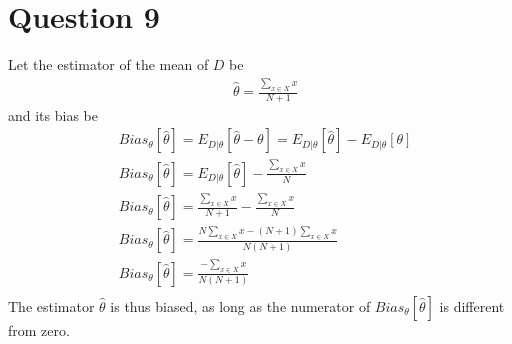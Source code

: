 \documentclass[leqno]{article}
\begin{document}
\section*{Question 9} Let the estimator of the mean of $D$ be
\begin{equation*}
\begin{split}
&\hat{\theta} = \frac{\sum_{x \in X}x}{N + 1}
\end{split}
\end{equation*} 
and its bias be
\begin{equation*}
\begin{split}
&Bias_{\theta}[\hat{\theta}] = E_{D|\theta}[\hat{\theta} - \theta] =  E_{D|\theta}[\hat{\theta}] - E_{D|\theta}[\theta]\\
&Bias_{\theta}[\hat{\theta}] = E_{D|\theta}[\hat{\theta}] - \frac{\sum_{x \in X}x}{N}\\
&Bias_{\theta}[\hat{\theta}] = \frac{\sum_{x \in X}x}{N + 1} -  \frac{\sum_{x \in X}x}{N}\\
&Bias_{\theta}[\hat{\theta}] = \frac{N\sum_{x \in X}x - (N + 1)\sum_{x \in X}x}{N(N + 1)}\\
&Bias_{\theta}[\hat{\theta}] = \frac{-\sum_{x \in X}x}{N(N + 1)}\\
\end{split}
\end{equation*}  
The estimator $\hat{\theta}$ is thus biased, as long as the numerator of $Bias_{\theta}[\hat{\theta}]$ is different from zero.

\hfill
\end{document}
